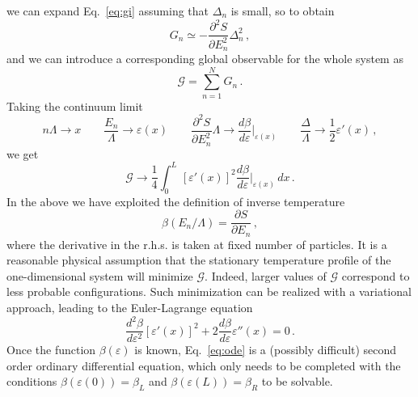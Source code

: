 \documentclass[iop, twocolumns, amssymb,notitlepage]{revtex4-1}
\newcommand{\indice}{n}
\begin{document}
we can expand Eq.~\eqref{eq:gi} assuming that $\Delta_\indice$ is small, so to obtain
\begin{equation}
 G_\indice \simeq -\frac{\partial^2 S}{\partial E_\indice^2}\Delta_\indice^2\,,
\end{equation}
and we can introduce a corresponding global observable for the whole system as
\begin{equation}
 \mathcal{G}=\sum_{\indice=1}^{N} G_\indice\,.
\end{equation} 
Taking the continuum limit
\begin{equation}
  n \Lambda \to x\quad\quad\frac{E_n}{\Lambda} \to \varepsilon(x)\quad\quad\frac{\partial^2 S}{\partial E^2_n}\Lambda \to \frac{d \beta}{d \varepsilon}\Big|_{\varepsilon(x)}\quad\quad \frac{\Delta}{\Lambda}\to \frac{1}{2}\varepsilon'(x)\,,
\end{equation}
we get
\begin{equation}
\label{eq:gcal}
 \mathcal{G}\to\frac{1}{4}\int_{0}^L\,\left[\varepsilon'(x)\right]^2 \frac{d \beta}{d \varepsilon}\Big|_{\varepsilon(x)} \,dx\,.
\end{equation} 
In the above we have exploited the definition of inverse temperature
\begin{equation}
 \beta\left( E_n/\Lambda \right)=\frac{\partial S}{\partial E_n}\,,
\end{equation} 
where the derivative in the r.h.s. is taken at fixed number of particles.
It is a reasonable physical assumption that the stationary temperature profile 
of the one-dimensional system will minimize $\mathcal{G}$. Indeed, larger values 
of $\mathcal{G}$ correspond to less probable configurations. Such minimization 
can be realized with a variational approach, leading to the Euler-Lagrange 
equation
\begin{equation}
\label{eq:ode}
 \frac{d^2\beta}{d \varepsilon^2}\left[  \varepsilon'(x)\right]^2 + 2 \frac{d \beta}{d \varepsilon}\varepsilon''(x)=0\,.
\end{equation}
Once the function $\beta(\varepsilon)$ is known, Eq.~\eqref{eq:ode} is a 
(possibly difficult) second order ordinary  differential equation, which only 
needs to be completed with the conditions $\beta(\varepsilon(0))=\beta_L$ and 
$\beta(\varepsilon(L))=\beta_R$ to be solvable.
\end{document}

